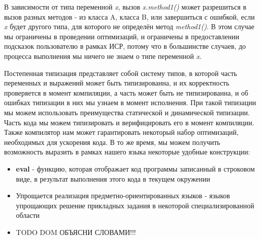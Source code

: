 \vskip4pt


В зависимости от типа переменной \textit{x}, вызов \textit{x.method1()} может разрешиться в вызов разных методов - из класса A, класса B, или завершиться с ошибкой, если \textit{x} будет другого типа, для которого не определён метод \textit{method1()}. В этом случае мы ограничены в проведении оптимизаций, и ограничены в предоставлении подсказок пользователю в рамках ИСР, потому что в большинстве случаев, до процесса выполнения мы ничего не знаем о типе переменной \textit{x}.

Постепенная типизация представляет собой систему типов, в которой часть переменных и выражений может быть типизированна, и их корректность проверяется в момент компиляции, а часть может быть не типизированна, и об ошибках типизации в них мы узнаем в момент исполнения. При такой типизации мы можем использовать преимущества статической и динамической типизации. Часть кода мы можем типизировать и верифицировать его в момент компиляции. Также компилятор нам может гарантировать некоторый набор оптимизаций, необходимых для ускорения кода. В то же время, мы можем получить возможность выразить в рамках нашего языка некоторые удобные конструкции:

\begin{itemize}
    \item \textbf{eval} - функцию, которая отображает код программы записанный в строковом виде, в результат выполнения этого кода в текущем окружении
    \item Упрощается реализация предметно-ориентированных языков - языков упрощающих решение прикладных задания в некоторой специализированной области
    \item TODO DOM  ОБЪЯСНИ СЛОВАМИ!!!
\end{itemize}

